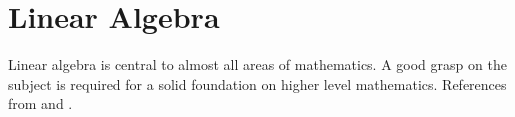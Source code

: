\section{Linear Algebra}

Linear algebra is central to almost all areas of mathematics. A good grasp on the subject is required for a solid foundation on higher level mathematics. References from \cite{garcia2017second} and \cite{axler2024linear}.




